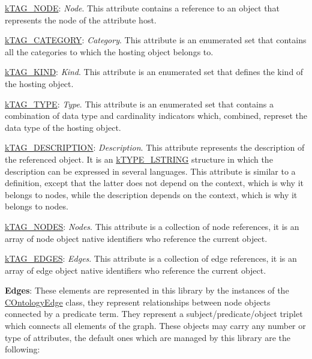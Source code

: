 {\begin{DoxyItemize}
\begin{DoxyItemize}
\item {\ttfamily \hyperlink{}{k\-T\-A\-G\-\_\-\-N\-O\-D\-E}}\-: {\itshape Node}. This attribute contains a reference to an object that represents the node of the attribute host. 
\item {\ttfamily \hyperlink{}{k\-T\-A\-G\-\_\-\-C\-A\-T\-E\-G\-O\-R\-Y}}\-: {\itshape Category}. This attribute is an enumerated set that contains all the categories to which the hosting object belongs to. 
\item {\ttfamily \hyperlink{}{k\-T\-A\-G\-\_\-\-K\-I\-N\-D}}\-: {\itshape Kind}. This attribute is an enumerated set that defines the kind of the hosting object. 
\item {\ttfamily \hyperlink{}{k\-T\-A\-G\-\_\-\-T\-Y\-P\-E}}\-: {\itshape Type}. This attribute is an enumerated set that contains a combination of data type and cardinality indicators which, combined, represet the data type of the hosting object. 
\item {\ttfamily \hyperlink{}{k\-T\-A\-G\-\_\-\-D\-E\-S\-C\-R\-I\-P\-T\-I\-O\-N}}\-: {\itshape Description}. This attribute represents the description of the referenced object. It is an \hyperlink{}{k\-T\-Y\-P\-E\-\_\-\-L\-S\-T\-R\-I\-N\-G} structure in which the description can be expressed in several languages. This attribute is similar to a definition, except that the latter does not depend on the context, which is why it belongs to nodes, while the description depends on the context, which is why it belongs to nodes. 
\item {\ttfamily \hyperlink{}{k\-T\-A\-G\-\_\-\-N\-O\-D\-E\-S}}\-: {\itshape Nodes}. This attribute is a collection of node references, it is an array of node object native identifiers who reference the current object. 
\item {\ttfamily \hyperlink{}{k\-T\-A\-G\-\_\-\-E\-D\-G\-E\-S}}\-: {\itshape Edges}. This attribute is a collection of edge references, it is an array of edge object native identifiers who reference the current object. 
\end{DoxyItemize}
\item {\bfseries Edges}\-: These elements are represented in this library by the instances of the \hyperlink{class_c_ontology_edge}{C\-Ontology\-Edge} class, they represent relationships between node objects connected by a predicate term. They represent a subject/predicate/object triplet which connects all elements of the graph. These objects may carry any number or type of attributes, the default ones which are managed by this library are the following\-: 

\end{DoxyItemize}}
